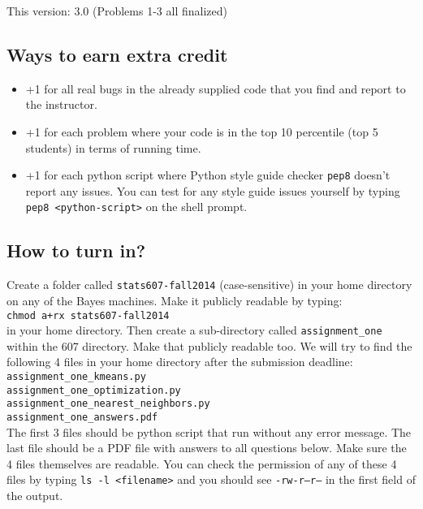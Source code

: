 \documentclass{article}
\begin{document}
\maketitle

\begin{center}
This version: 3.0 (Problems 1-3 all finalized)
\end{center}

\subsection*{Ways to earn extra credit}

\begin{itemize}
\item +1 for all real bugs in the already supplied code that you find and report to the instructor.
\item +1 for each problem where your code is in the top 10 percentile (top 5 students) in terms of running time.
\item +1 for each python script where Python style guide checker {\tt pep8} doesn't report any issues. You can test for any style guide issues yourself by typing
{\tt pep8 <python-script>} on the shell prompt.

\end{itemize}

\subsection*{How to turn in?}

Create a folder called {\tt stats607-fall2014} (case-sensitive) in your home directory on any of the Bayes machines. Make it publicly readable by typing:\\
{\tt chmod a+rx stats607-fall2014} \\
in your home directory. Then create a sub-directory called {\tt assignment\_one} within the 607 directory. Make that publicly readable too. We will try to find the
following 4 files in your home directory after the submission deadline:\\
{\tt assignment\_one\_kmeans.py} \\
{\tt assignment\_one\_optimization.py} \\
{\tt assignment\_one\_nearest\_neighbors.py} \\
{\tt assignment\_one\_answers.pdf} \\

The first 3 files should be python script that run without any error message. The last file should be a PDF file with answers to all questions below. Make sure the 4 files
themselves are readable. You can check the permission of any of these 4 files by typing {\tt ls -l <filename>} and you should see {\tt -rw-r--r--} in the first field of the output.
\end{document}
